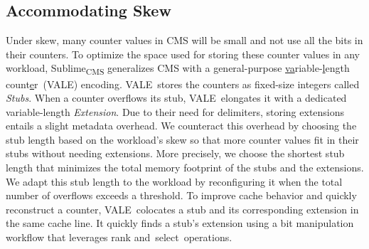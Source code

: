 \documentclass[sigconf]{acmart}
\newcommand{\sketch}{Sublime}
\newcommand{\sketchcms}{\sketch\textsubscript{CMS}\xspace}
\newcommand{\counterencoding}{\underline{va}riable-\underline{l}ength count\underline{e}r}
\newcommand{\counterencodingabbrv}{VALE}
\begin{document}
\subsection{Accommodating Skew}\label{sec:accommodating_skew}
Under skew, many counter values in CMS will be small and not use all the bits
in their counters. To optimize the space used for storing these counter values
in any workload, \sketchcms generalizes CMS with a general-purpose
\counterencoding~(\counterencodingabbrv) encoding. \counterencodingabbrv\
stores the counters as fixed-size integers called \emph{Stubs}. When a counter
overflows its stub, \counterencodingabbrv\ elongates it with a dedicated
variable-length \emph{Extension}. Due to their need for delimiters, storing
extensions entails a slight metadata overhead. We counteract this overhead by
choosing the stub length based on the workload’s skew so that more counter
values fit in their stubs without needing extensions. More precisely, we choose
the shortest stub length that minimizes the total memory footprint of the stubs
and the extensions. We adapt this stub length to the workload by reconfiguring
it when the total number of overflows exceeds a threshold. To improve cache
behavior and quickly reconstruct a counter, \counterencodingabbrv\ colocates a
stub and its corresponding extension in the same cache line. It quickly finds a
stub's extension using a bit manipulation workflow that leverages rank
and~select~operations.
\end{document}
